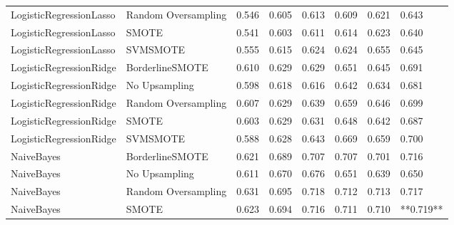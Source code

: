 \begin{tabular}{llllllll}
     LogisticRegressionLasso & Random Oversampling & 0.546 &                     0.605 &                 0.613 &                  0.609 &                                   0.621 &     0.643 \\
     LogisticRegressionLasso &               SMOTE & 0.541 &                     0.603 &                 0.611 &                  0.614 &                                   0.623 &     0.640 \\
     LogisticRegressionLasso &            SVMSMOTE & 0.555 &                     0.615 &                 0.624 &                  0.624 &                                   0.655 &     0.645 \\
     LogisticRegressionRidge &     BorderlineSMOTE & 0.610 &                     0.629 &                 0.629 &                  0.651 &                                   0.645 &     0.691 \\
     LogisticRegressionRidge &       No Upsampling & 0.598 &                     0.618 &                 0.616 &                  0.642 &                                   0.634 &     0.681 \\
     LogisticRegressionRidge & Random Oversampling & 0.607 &                     0.629 &                 0.639 &                  0.659 &                                   0.646 &     0.699 \\
     LogisticRegressionRidge &               SMOTE & 0.603 &                     0.629 &                 0.631 &                  0.648 &                                   0.642 &     0.687 \\
     LogisticRegressionRidge &            SVMSMOTE & 0.588 &                     0.628 &                 0.643 &                  0.669 &                                   0.659 &     0.700 \\
                  NaiveBayes &     BorderlineSMOTE & 0.621 &                     0.689 &                 0.707 &                  0.707 &                                   0.701 &     0.716 \\
                  NaiveBayes &       No Upsampling & 0.611 &                     0.670 &                 0.676 &                  0.651 &                                   0.639 &     0.650 \\
                  NaiveBayes & Random Oversampling & 0.631 &                     0.695 &                 0.718 &                  0.712 &                                   0.713 &     0.717 \\
                  NaiveBayes &               SMOTE & 0.623 &                     0.694 &                 0.716 &                  0.711 &                                   0.710 & **0.719** \\

\end{tabular}
